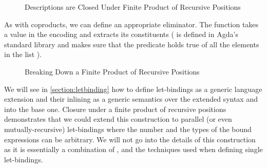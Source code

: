 \begin{figure}[h]
\caption{Descriptions are Closed Under Finite Product of Recursive Positions\label{figure:descprod}}
\end{figure}

As with coproducts, we can define an appropriate eliminator. The function 
takes a value in the encoding and extracts its constituents ({  }
is defined in Agda's standard library and makes sure that the predicate  holds
true of all the elements in the list ).

\begin{figure}[h]
\caption{Breaking Down a Finite Product of Recursive Positions\label{figure:descprodelim}}
\end{figure}

We will see in \cref{section:letbinding} how to define let-bindings as a generic
language extension and their inlining as a generic semantics over the extended
syntax and into the base one. Closure under a finite product of recursive positions
demonstrates that we could extend this construction to parallel (or even mutually-recursive)
let-bindings where the number and the types of the bound expressions can be arbitrary.
We will not go into the details of this construction as it is essentially a combination
of ,  and the techniques used when defining single let-bindings.
